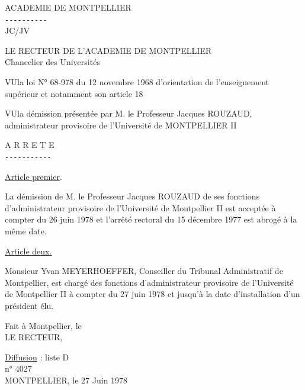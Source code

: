 \begin{center}\end{center}

ACADEMIE DE MONTPELLIER\\
\texttt{-{}-{}-{}-{}-{}-{}-{}-{}-{}-}\\
JC/JV

LE RECTEUR DE L'ACADEMIE DE MONTPELLIER\\
Chancelier des Universités

VU\quad la loi N° 68-978 du 12 novembre 1968 d'orientation de l'enseignement supérieur et notamment son article 18

VU\quad la démission présentée par M. le Professeur Jacques ROUZAUD, administrateur provisoire de l'Université de MONTPELLIER II

\begin{center}A R R E T E\\
\texttt{-{}-{}-{}-{}-{}-{}-{}-{}-{}-{}-}\end{center}

\uline{Article premier}.

La démission de M. le Professeur Jacques ROUZAUD de ses fonctions d'administrateur provisoire de l'Université de Montpellier II est acceptée à compter du 26 juin 1978 et l'arrêté rectoral du 15 décembre 1977 est abrogé à la même date.

\uline{Article deux.}

Monsieur Yvan MEYERHOEFFER, Conseiller du Tribunal Administratif de Montpellier, est chargé des fonctions d'administrateur provisoire de l'Université de Montpellier II à compter du 27 juin 1978 et jusqu'à la date d'installation d'un président élu.

Fait à Montpellier, le \\
LE RECTEUR,\\

\uline{Diffusion} : liste D\\
n° 4027\\
MONTPELLIER, le 27 Juin 1978

